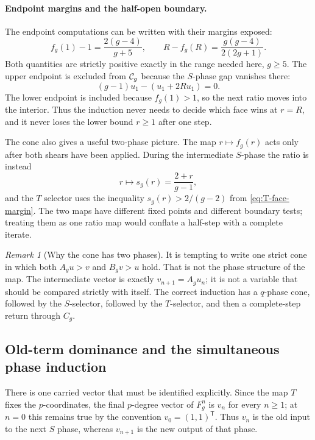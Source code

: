 \documentclass[11pt]{article}
\theoremstyle{remark}
\newtheorem{remark}[theorem]{Remark}
\numberwithin{equation}{section}
\begin{document}
\paragraph{Endpoint margins and the half-open boundary.}
The endpoint computations can be written with their margins exposed:
\[
 f_g(1)-1=\frac{2(g-4)}{g+5},
 \qquad
 R-f_g(R)=\frac{g(g-4)}{2(2g+1)}.
\tag{Cone margins}\label{eq:cone-margins}
\]
Both quantities are strictly positive exactly in the range needed here,
$g\geq5$.  The upper endpoint is excluded from $\mathcal{C}_g$ because the
$S$-phase gap vanishes there:
\[
 (g-1)u_1-(u_1+2Ru_1)=0.
\]
The lower endpoint is included because $f_g(1)>1$, so the next ratio moves
into the interior.  Thus the induction never needs to decide which face wins
at $r=R$, and it never loses the lower bound $r\geq1$ after one step.

The cone also gives a useful two-phase picture.  The map $r\mapsto f_g(r)$
acts only after both shears have been applied.  During the intermediate
$S$-phase the ratio is instead
\[
 r\longmapsto s_g(r)=\frac{2+r}{g-1},
\]
and the $T$ selector uses the inequality
$s_g(r)>2/(g-2)$ from \eqref{eq:T-face-margin}.  The two maps have different
fixed points and different boundary tests; treating them as one ratio map
would conflate a half-step with a complete iterate.

\begin{remark}[Why the cone has two phases]\label{rem:twophase}
It is tempting to write one strict cone in which both
\(A_gu>v\) and \(B_gv>u\) hold.  That is not the phase structure of the map.
The intermediate vector is exactly \(v_{n+1}=A_gu_n\); it is not a variable
that should be compared strictly with itself.  The correct induction has a
\(q\)-phase cone, followed by the \(S\)-selector, followed by the \(T\)-selector,
and then a complete-step return through \(C_g\).
\end{remark}

\subsection{Old-term dominance and the simultaneous phase induction}

There is one carried vector that must be identified explicitly.  Since the map
$T$ fixes the $p$-coordinates, the final $p$-degree vector of $F_g^n$ is
$v_n$ for every $n\geq1$; at $n=0$ this remains true by the convention
$v_0=(1,1)^{\mathsf T}$.  Thus $v_n$ is the old input to the next $S$ phase,
whereas $v_{n+1}$ is the new output of that phase.
\end{document}
